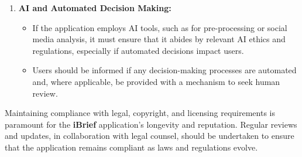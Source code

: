 \begin{enumerate}
    \item \textbf{AI and Automated Decision Making:}
    \begin{itemize}
        \item If the application employs \gls{AI} tools, such as for \gls{pre-processing} or social media analysis, it must ensure that it abides by relevant \gls{AI} ethics and regulations, especially if automated decisions impact users.
        \item Users should be informed if any decision-making processes are automated and, where applicable, be provided with a mechanism to seek human review.
    \end{itemize}
\end{enumerate}

Maintaining compliance with legal, copyright, and licensing requirements is paramount for the \textbf{iBrief} application's longevity and reputation. Regular reviews and updates, in collaboration with legal counsel, should be undertaken to ensure that the application remains compliant as laws and regulations evolve.
